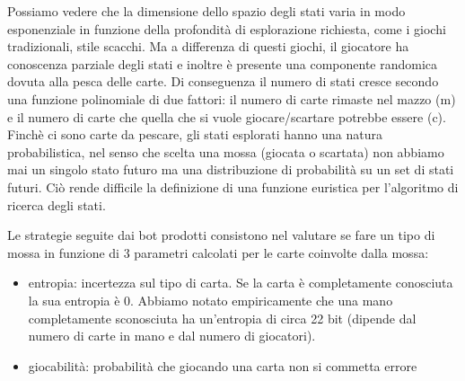\documentclass{article}
\begin{document}
\begin{flushleft}
Possiamo vedere che la dimensione dello spazio degli stati varia in modo esponenziale in funzione della profondità di esplorazione richiesta, come i giochi tradizionali, stile scacchi.\newline
Ma a differenza di questi giochi, il giocatore ha conoscenza parziale degli stati e inoltre è presente una componente randomica dovuta alla pesca delle carte. Di conseguenza il numero di stati cresce secondo una funzione polinomiale di due fattori: il numero di carte rimaste nel mazzo (m) e il numero di carte che quella che si vuole giocare/scartare potrebbe essere (c).\newline
\newline
Finchè ci sono carte da pescare, gli stati esplorati hanno una natura probabilistica, nel senso che scelta una mossa (giocata o scartata) non abbiamo mai un singolo stato futuro ma una distribuzione di probabilità su un set di stati futuri. Ciò rende difficile la definizione di una funzione euristica per l'algoritmo di ricerca degli stati. \newline

Le strategie seguite dai bot prodotti consistono nel valutare se fare un tipo di mossa in funzione di 3 parametri calcolati per le carte coinvolte dalla mossa:
\begin{itemize}
    \item entropia: incertezza sul tipo di carta. Se la carta è completamente conosciuta la sua entropia è 0. Abbiamo notato empiricamente che una mano completamente sconosciuta ha un'entropia di circa 22 bit (dipende dal numero di carte in mano e dal numero di giocatori).
    
    \item giocabilità: probabilità che giocando una carta non si commetta errore 
    

\end{itemize}
\end{flushleft}
\end{document}
